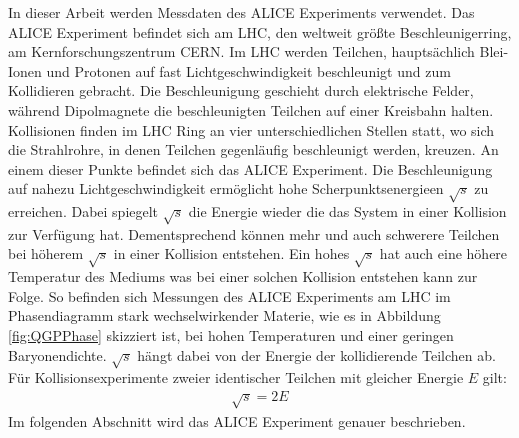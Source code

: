 In dieser Arbeit werden Messdaten des ALICE Experiments verwendet.
Das ALICE Experiment befindet sich am LHC, den weltweit gr\"o{\ss}te Beschleunigerring, am Kernforschungszentrum CERN.
Im LHC werden Teilchen, haupts\"achlich Blei-Ionen und Protonen auf fast Lichtgeschwindigkeit beschleunigt und zum Kollidieren gebracht.
Die Beschleunigung geschieht durch elektrische Felder, w\"ahrend Dipolmagnete die beschleunigten Teilchen auf einer Kreisbahn halten.
Kollisionen finden im LHC Ring an vier unterschiedlichen Stellen statt, wo sich die Strahlrohre, in denen Teilchen gegenl\"aufig beschleunigt werden, kreuzen.
An einem dieser Punkte befindet sich das ALICE Experiment.
\newline
Die Beschleunigung auf nahezu Lichtgeschwindigkeit erm\"oglicht hohe Scherpunktsenergieen $\sqrt{s}$ zu erreichen.
Dabei spiegelt $\sqrt{s}$ die Energie wieder die das System in einer Kollision zur Verf\"ugung hat.
Dementsprechend k\"onnen mehr und auch schwerere Teilchen bei h\"oherem $\sqrt{s}$  in einer Kollision entstehen.
Ein hohes $\sqrt{s}$ hat auch eine h\"ohere Temperatur des Mediums was bei einer solchen Kollision entstehen kann zur Folge.
So befinden sich Messungen des ALICE Experiments am LHC im Phasendiagramm stark wechselwirkender Materie, wie es in Abbildung \ref{fig:QGPPhase} skizziert ist, bei hohen Temperaturen und einer geringen Baryonendichte.
$\sqrt{s}$ h\"angt dabei von der Energie der kollidierende Teilchen ab.
F\"ur Kollisionsexperimente zweier identischer Teilchen mit gleicher Energie $E$ gilt:
\begin{align}
\sqrt{s} = 2E \label{eq:sqrts}
\end{align}
\newline
Im folgenden Abschnitt wird das ALICE Experiment genauer beschrieben.